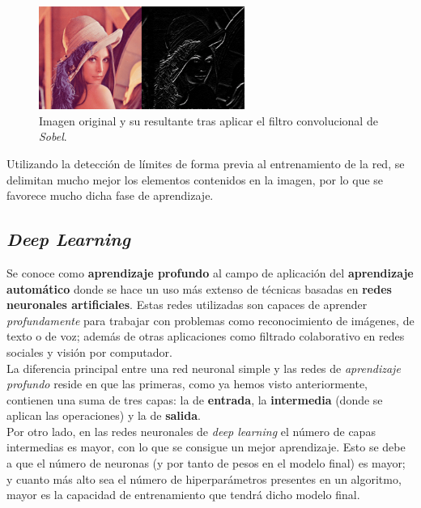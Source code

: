 \documentclass[]{scrartcl}
\begin{document}
			\begin{figure}[h]
				\centering
				\includegraphics[width=0.6\textwidth]{./img/lenna+horizontal}
				\caption{Imagen original y su resultante tras aplicar el filtro convolucional de \textit{Sobel}.}
				\label{conv-filter-result}
			\end{figure}
		
			Utilizando la detección de límites de forma previa al entrenamiento de la red, se delimitan mucho mejor los elementos contenidos en la imagen, por lo que se favorece mucho dicha fase de aprendizaje.
	
	\subsection{\textit{Deep Learning}}
	
		Se conoce como \textbf{aprendizaje profundo} al campo de aplicación del \textbf{aprendizaje automático} donde se hace un uso más extenso de técnicas basadas en \textbf{redes neuronales artificiales}. Estas redes utilizadas son capaces de aprender \textit{profundamente} para trabajar con problemas como reconocimiento de imágenes, de texto o de voz; además de otras aplicaciones como filtrado colaborativo en redes sociales y visión por computador.\\
		
		La diferencia principal entre una red neuronal simple y las redes de \textit{aprendizaje profundo} reside en que las primeras, como ya hemos visto anteriormente, contienen una suma de tres capas: la de \textbf{entrada}, la \textbf{intermedia} (donde se aplican las operaciones) y la de \textbf{salida}.\\
		
		Por otro lado, en las redes neuronales de \textit{deep learning} el número de capas intermedias es mayor, con lo que se consigue un mejor aprendizaje. Esto se debe a que el número de neuronas (y por tanto de pesos en el modelo final) es mayor; y cuanto más alto sea el número de hiperparámetros presentes en un algoritmo, mayor es la capacidad de entrenamiento que tendrá dicho modelo final.
		
\end{document}
